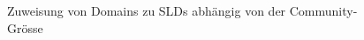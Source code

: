 \begin{figure}[t]
  \caption{Zuweisung von Domains zu SLDs abh\"angig von der Community-Gr\"osse}
  \label{fig:sld-suredist}
\end{figure}

